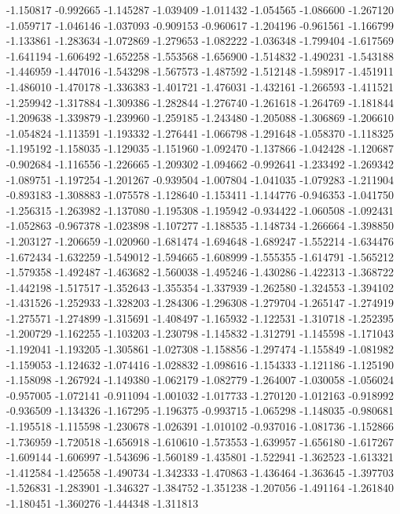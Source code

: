 -1.150817
-0.992665
-1.145287
-1.039409
-1.011432
-1.054565
-1.086600
-1.267120
-1.059717
-1.046146
-1.037093
-0.909153
-0.960617
-1.204196
-0.961561
-1.166799
-1.133861
-1.283634
-1.072869
-1.279653
-1.082222
-1.036348
-1.799404
-1.617569
-1.641194
-1.606492
-1.652258
-1.553568
-1.656900
-1.514832
-1.490231
-1.543188
-1.446959
-1.447016
-1.543298
-1.567573
-1.487592
-1.512148
-1.598917
-1.451911
-1.486010
-1.470178
-1.336383
-1.401721
-1.476031
-1.432161
-1.266593
-1.411521
-1.259942
-1.317884
-1.309386
-1.282844
-1.276740
-1.261618
-1.264769
-1.181844
-1.209638
-1.339879
-1.239960
-1.259185
-1.243480
-1.205088
-1.306869
-1.206610
-1.054824
-1.113591
-1.193332
-1.276441
-1.066798
-1.291648
-1.058370
-1.118325
-1.195192
-1.158035
-1.129035
-1.151960
-1.092470
-1.137866
-1.042428
-1.120687
-0.902684
-1.116556
-1.226665
-1.209302
-1.094662
-0.992641
-1.233492
-1.269342
-1.089751
-1.197254
-1.201267
-0.939504
-1.007804
-1.041035
-1.079283
-1.211904
-0.893183
-1.308883
-1.075578
-1.128640
-1.153411
-1.144776
-0.946353
-1.041750
-1.256315
-1.263982
-1.137080
-1.195308
-1.195942
-0.934422
-1.060508
-1.092431
-1.052863
-0.967378
-1.023898
-1.107277
-1.188535
-1.148734
-1.266664
-1.398850
-1.203127
-1.206659
-1.020960
-1.681474
-1.694648
-1.689247
-1.552214
-1.634476
-1.672434
-1.632259
-1.549012
-1.594665
-1.608999
-1.555355
-1.614791
-1.565212
-1.579358
-1.492487
-1.463682
-1.560038
-1.495246
-1.430286
-1.422313
-1.368722
-1.442198
-1.517517
-1.352643
-1.355354
-1.337939
-1.262580
-1.324553
-1.394102
-1.431526
-1.252933
-1.328203
-1.284306
-1.296308
-1.279704
-1.265147
-1.274919
-1.275571
-1.274899
-1.315691
-1.408497
-1.165932
-1.122531
-1.310718
-1.252395
-1.200729
-1.162255
-1.103203
-1.230798
-1.145832
-1.312791
-1.145598
-1.171043
-1.192041
-1.193205
-1.305861
-1.027308
-1.158856
-1.297474
-1.155849
-1.081982
-1.159053
-1.124632
-1.074416
-1.028832
-1.098616
-1.154333
-1.121186
-1.125190
-1.158098
-1.267924
-1.149380
-1.062179
-1.082779
-1.264007
-1.030058
-1.056024
-0.957005
-1.072141
-0.911094
-1.001032
-1.017733
-1.270120
-1.012163
-0.918992
-0.936509
-1.134326
-1.167295
-1.196375
-0.993715
-1.065298
-1.148035
-0.980681
-1.195518
-1.115598
-1.230678
-1.026391
-1.010102
-0.937016
-1.081736
-1.152866
-1.736959
-1.720518
-1.656918
-1.610610
-1.573553
-1.639957
-1.656180
-1.617267
-1.609144
-1.606997
-1.543696
-1.560189
-1.435801
-1.522941
-1.362523
-1.613321
-1.412584
-1.425658
-1.490734
-1.342333
-1.470863
-1.436464
-1.363645
-1.397703
-1.526831
-1.283901
-1.346327
-1.384752
-1.351238
-1.207056
-1.491164
-1.261840
-1.180451
-1.360276
-1.444348
-1.311813

